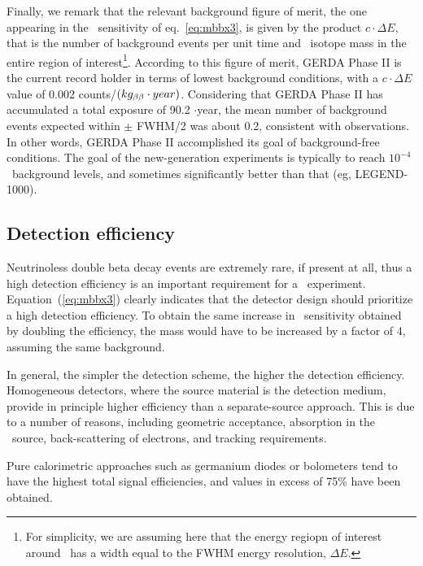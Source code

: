 Finally, we remark that the relevant background figure of merit, the one appearing in the \mbb\ sensitivity of eq.~\ref{eq:mbbx3}, is given by the product $c\cdot \Delta E$, that is the number of background events per unit time and \bb\ isotope mass in the entire region of interest\footnote{For simplicity, we are assuming here that the energy regiopn of interest around \Qbb\ has a width equal to the FWHM energy resolution, $\Delta E$.}. According to this figure of merit, GERDA Phase II is the current record holder in terms of lowest background conditions, with a $c\cdot \Delta E$ value of 0.002 counts/$(kg_{\beta\beta}\cdot year)$. Considering that GERDA Phase II has accumulated a total exposure of 90.2 \kgbb$\cdot$year, the mean number of background events expected within \Qbb $\pm$ FWHM/2 was about 0.2, consistent with observations. In other words, GERDA Phase II accomplished its goal of background-free conditions. The goal of the new-generation experiments is typically to reach $10^{-4}$ \ckkbby\ background levels, and sometimes significantly better than that (eg, LEGEND-1000).




\subsection{Detection efficiency} \label{subsec:efficiency}

Neutrinoless double beta decay events are extremely rare, if present at all, thus a high detection efficiency is an important requirement for a \bb\ experiment. Equation~(\ref{eq:mbbx3}) clearly indicates that the detector design should prioritize a high detection efficiency. To obtain the same increase in \mbb\ sensitivity obtained by doubling the efficiency, the mass would have to be increased by a factor of 4, assuming the same background.

In general, the simpler the detection scheme, the higher the detection efficiency. Homogeneous detectors, where the source material is the detection medium, provide in principle higher efficiency than a separate-source approach. This is due to a number of reasons, including geometric acceptance, absorption in the \bb\ source, back-scattering of electrons, and tracking requirements.

Pure calorimetric approaches such as germanium diodes or bolometers tend to have the highest total signal efficiencies, and values in excess of 75\% have been obtained. 

